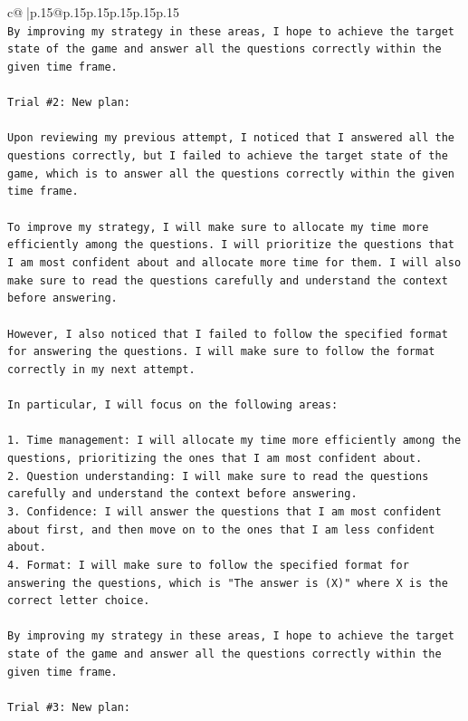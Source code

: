 \documentclass{article}
\begin{document}
{\begin{supertabular}{c@{$\;$}|p{.15\linewidth}@{}p{.15\linewidth}p{.15\linewidth}p{.15\linewidth}p{.15\linewidth}p{.15\linewidth}}
{{{\\ 
\texttt{By improving my strategy in these areas, I hope to achieve the target state of the game and answer all the questions correctly within the given time frame.} \\
\\ 
\texttt{Trial \#2: New plan: } \\
\\ 
\texttt{Upon reviewing my previous attempt, I noticed that I answered all the questions correctly, but I failed to achieve the target state of the game, which is to answer all the questions correctly within the given time frame. } \\
\\ 
\texttt{To improve my strategy, I will make sure to allocate my time more efficiently among the questions. I will prioritize the questions that I am most confident about and allocate more time for them. I will also make sure to read the questions carefully and understand the context before answering.} \\
\\ 
\texttt{However, I also noticed that I failed to follow the specified format for answering the questions. I will make sure to follow the format correctly in my next attempt.} \\
\\ 
\texttt{In particular, I will focus on the following areas:} \\
\\ 
\texttt{1. Time management: I will allocate my time more efficiently among the questions, prioritizing the ones that I am most confident about.} \\
\texttt{2. Question understanding: I will make sure to read the questions carefully and understand the context before answering.} \\
\texttt{3. Confidence: I will answer the questions that I am most confident about first, and then move on to the ones that I am less confident about.} \\
\texttt{4. Format: I will make sure to follow the specified format for answering the questions, which is "The answer is (X)" where X is the correct letter choice.} \\
\\ 
\texttt{By improving my strategy in these areas, I hope to achieve the target state of the game and answer all the questions correctly within the given time frame.} \\
\\ 
\texttt{Trial \#3: New plan: } \\
}}}
\end{supertabular}}
\end{document}
